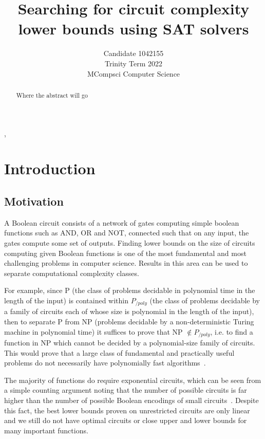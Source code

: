 \documentclass{article}
\begin{document}
\begin{titlepage}
\title{Searching for circuit complexity lower bounds using SAT solvers}
\author{Candidate 1042155\\Trinity Term 2022\\MCompsci Computer Science}
\maketitle
\end{titlepage}

\begin{abstract}
Where the abstract will go
\end{abstract},

\tableofcontents

\section{Introduction}

\subsection{Motivation}

A Boolean circuit consists of a network of gates computing simple boolean functions such as AND, OR and NOT, connected such that on any input, the gates compute some set of outputs. Finding lower bounds on the size of circuits computing given Boolean functions is one of the most fundamental and most challenging problems in computer science. Results in this area can be used to separate computational complexity classes.

For example, since P (the class of problems decidable in polynomial time in the length of the input) is contained within $P_{/poly}$ (the class of problems decidable by a family of circuits each of whose size is polynomial in the length of the input), then to separate P from NP (problems decidable by a non-deterministic Turing machine in polynomial time) it suffices to prove that NP $\notin P_{/poly}$, i.e. to find a function in NP which cannot be decided by a polynomial-size family of circuits. This would prove that a large class of fundamental and practically useful problems do not necessarily have polynomially fast algorithms~\cite{arora}. 

The majority of functions do require exponential circuits, which can be seen from a simple counting argument noting that the number of possible circuits is far higher than the number of possible Boolean encodings of small circuits~\cite{arora}. Despite this fact, the best lower bounds proven on unrestricted circuits are only linear~\cite{boppana} and we still do not have optimal circuits or close upper and lower bounds for many important functions.
\end{document}
